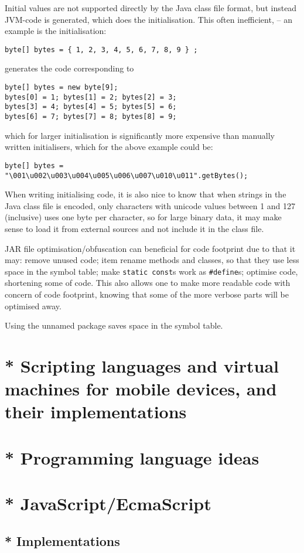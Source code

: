 Initial values are not supported directly by the Java class file format, but instead
JVM-code is generated, which does the initialisation. 
This often inefficient, -- an example is the initialisation:
\begin{verbatim}
byte[] bytes = { 1, 2, 3, 4, 5, 6, 7, 8, 9 } ;
\end{verbatim}
generates the code corresponding to
\begin{verbatim}
byte[] bytes = new byte[9];
bytes[0] = 1; bytes[1] = 2; bytes[2] = 3;
bytes[3] = 4; bytes[4] = 5; bytes[5] = 6;
bytes[6] = 7; bytes[7] = 8; bytes[8] = 9;
\end{verbatim}
which for larger initialisation is significantly more expensive than manually written initialisers,
which for the above example could be:
\begin{verbatim}
byte[] bytes = "\001\u002\u003\u004\u005\u006\u007\u010\u011".getBytes();
\end{verbatim}
When writing initialising code, it is also nice to know that when strings in the Java class file is encoded, only characters with unicode values between 1 and 127 (inclusive) uses one byte per character, so for large binary data, it may make sense to load it from external sources and not include it in the class file.

JAR file optimisation/obfuscation can beneficial for code footprint due to that it may:
remove unused code;
item rename methods and classes, so that they use less space in the symbol table;
make \verb|static const|s work as \verb|#define|s;
optimise code, shortening some of code.
This also allows one to make more readable code with concern of code footprint, knowing that some of the more verbose parts will be optimised away.

Using the unnamed package saves space in the symbol table.


\section{* Scripting languages and virtual machines for mobile devices, and their implementations}
\section{* Programming language ideas}
\section{* JavaScript/EcmaScript}
\subsection{* Implementations}
